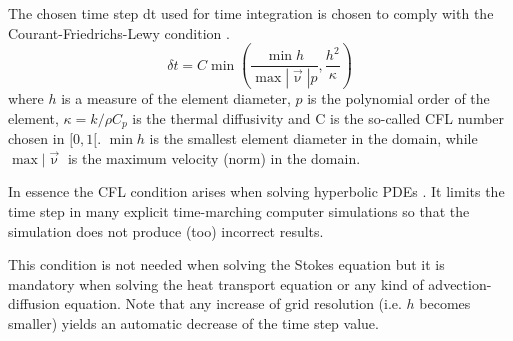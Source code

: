 The chosen time step dt used for time integration is chosen to
comply with the Courant-Friedrichs-Lewy condition \cite{cfd_anderson}.
\begin{equation}
\delta t = C \min \left( \frac{\min h}{\max |{\vec\upnu}| p} , \frac{h^2}{\kappa}  \right)
\end{equation}
where $h$ is a measure of the element diameter, $p$ is the polynomial order of the element, 
$\kappa = k/ \rho C_p$ 
is the thermal diffusivity and C is the so-called CFL number chosen in $[0,1[$.
$\min h$ is the smallest element diameter in the domain, while $\max |{\vec\upnu}$ is the 
maximum velocity (norm) in the domain. 

In essence the CFL condition arises when solving hyperbolic PDEs .
It limits the time step in many explicit time-marching computer simulations
so that the simulation does not produce (too) incorrect results. 

This condition is not needed when solving the Stokes equation but it is mandatory 
when solving the heat transport equation or any kind of advection-diffusion equation. 
Note that any increase of grid resolution (i.e. $h$ becomes smaller) yields an automatic 
decrease of the time step value.





